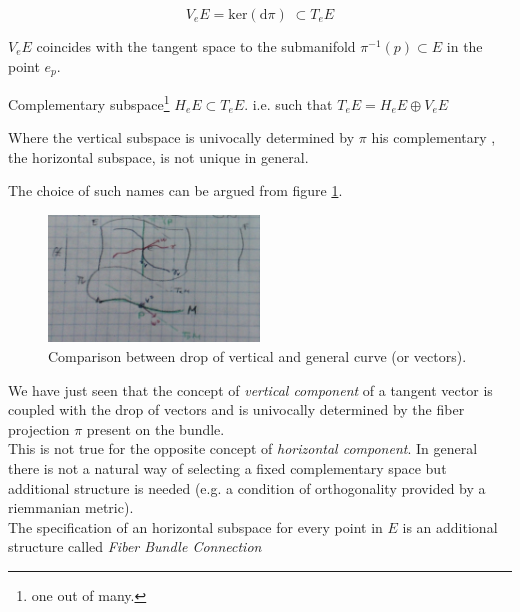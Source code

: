 \documentclass[a4paper,12pt]{scrartcl}    %
\begin{document}
\begin{definition}
\begin{displaymath}
V_e E = \textrm{ker}( \textrm{d}\pi) \; \subset T_e E
\end{displaymath}
\end{definition}

\begin{observation}
$V_e E$ coincides with the tangent space to the submanifold $\pi^{-1}(p) \subset E$ in the point $e_p$.
\end{observation}


\begin{definition}
Complementary subspace\footnote{one out of many.} $H_e E \subset T_e E$.
i.e. such that $T_e E = H_e E \oplus V_e E$
\end{definition}

\begin{observation}
Where the vertical subspace is univocally determined by $\pi$ his complementary , the horizontal subspace, is not unique in general.
\end{observation}
The choice of such names can be argued from figure \ref{fig:VerHorSubspaces}.
\begin{figure}[h!]
  \caption{Comparison between drop of vertical and general curve (or vectors).}\label{fig:VerHorSubspaces}
  	\includegraphics[width=0.5\textwidth]{TempPictures/VerHorSubspaces.jpg}
  \centering
\end{figure}

\begin{observation}
We have just seen that the concept of \emph{vertical component} of a tangent vector is coupled with the drop of vectors and is univocally determined by the fiber projection $\pi$ present on the bundle.
\\
This is not true for the opposite concept of \emph{horizontal component}. In general there is not a natural way of selecting a fixed complementary space but additional structure is needed (e.g. a condition of orthogonality provided by a riemmanian metric).
\\
The specification of an horizontal subspace for every point in $E$ is an additional structure called \emph{Fiber Bundle Connection}
\end{observation}
\end{document}

